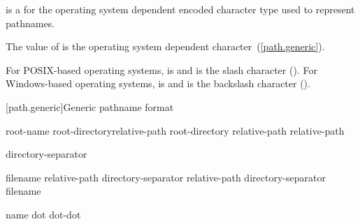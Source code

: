\pnum
{} is a  for the
operating system dependent encoded character type used to represent pathnames.

\pnum
The value of 
is the operating system dependent  character~(\ref{path.generic}).

\pnum
\begin{example}
For POSIX-based operating systems,
 is  and
 is the slash character ().
For Windows-based operating systems,
 is  and
 is the backslash character ().
\end{example}

[path.generic]{Generic pathname format}

\begin{ncbnf}
\br
    root-name root-directory\opt relative-path\opt\br
    root-directory relative-path\opt\br
    relative-path
\end{ncbnf}


\begin{ncbnf}
\br
    directory-separator
\end{ncbnf}

\begin{ncbnf}
\br
    filename\br
    relative-path directory-separator\br
    relative-path directory-separator filename
\end{ncbnf}

\begin{ncbnf}
\br
    name\br
    dot\br
    dot-dot
\end{ncbnf}

